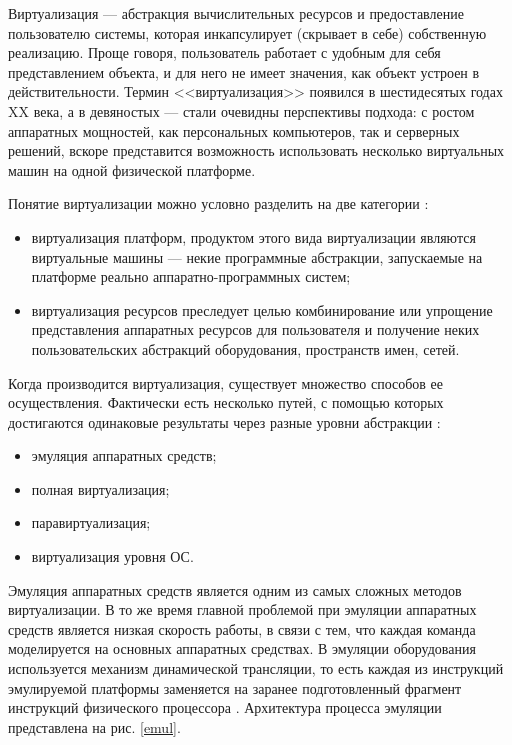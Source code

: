 Виртуализация --- абстракция вычислительных ресурсов и предоставление пользователю системы, которая инкапсулирует (скрывает в себе) собственную реализацию.
Проще говоря, пользователь работает с удобным для себя представлением объекта, и для него не имеет значения, как объект устроен в действительности.
Термин <<виртуализация>> появился в шестидесятых годах XX века, а в девяностых --- стали очевидны перспективы подхода: с ростом аппаратных мощностей, как персональных компьютеров, так и серверных решений, вскоре представится возможность использовать несколько виртуальных машин на одной физической платформе.

Понятие виртуализации можно условно разделить на две категории \cite{ibm-virt}:
\begin{itemize}
  \item виртуализация платформ, продуктом этого вида виртуализации являются виртуальные машины --- некие программные абстракции, запускаемые на платформе реально аппаратно-программных систем;
  \item виртуализация ресурсов преследует целью комбинирование или упрощение представления аппаратных ресурсов для пользователя и получение неких пользовательских абстракций оборудования, пространств имен, сетей.
\end{itemize}

Когда производится виртуализация, существует множество способов ее осуществления.
Фактически есть несколько путей, с помощью которых достигаются одинаковые результаты через разные уровни абстракции \cite{openvz-tutorial}:
\begin{itemize}
  \item эмуляция аппаратных средств;
  \item полная виртуализация;
  \item паравиртуализация;
  \item виртуализация уровня ОС.
\end{itemize}

Эмуляция аппаратных средств является одним из самых сложных методов виртуализации.
В то же время главной проблемой при эмуляции аппаратных средств является низкая скорость работы, в связи с тем, что каждая команда моделируется на основных аппаратных средствах.
В эмуляции оборудования используется механизм динамической трансляции, то есть каждая из инструкций эмулируемой платформы заменяется на заранее подготовленный фрагмент инструкций физического процессора \cite{qemu-ibm}.
Архитектура процесса эмуляции представлена на рис. \ref{emul}.

